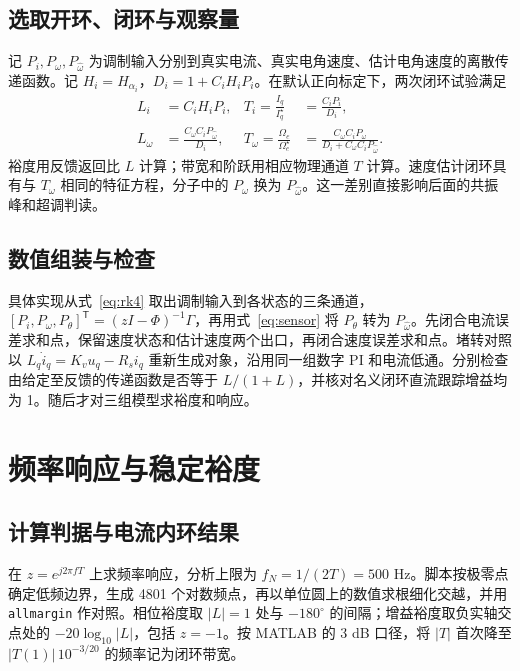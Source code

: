 \documentclass[UTF8,fontset=windows,11pt,a4paper]{ctexart}
\begin{document}
\subsection{选取开环、闭环与观察量}
记 $P_i,P_\omega,P_{\hat\omega}$ 为调制输入分别到真实电流、真实电角速度、估计电角速度的离散传递函数。记 $H_i=H_{\alpha_i}$，$D_i=1+C_iH_iP_i$。在默认正向标定下，两次闭环试验满足
\begin{align}
 L_i&=C_iH_iP_i, &
 T_i=\frac{I_q}{I_q^\star}&=\frac{C_iP_i}{D_i},\label{eq:inner}\\
 L_\omega&=\frac{C_\omega C_iP_{\hat\omega}}{D_i},&
 T_\omega=\frac{\Omega_e}{\Omega_e^\star}&=
 \frac{C_\omega C_iP_\omega}{D_i+C_\omega C_iP_{\hat\omega}} .\label{eq:outer}
\end{align}
裕度用反馈返回比 $L$ 计算；带宽和阶跃用相应物理通道 $T$ 计算。速度估计闭环具有与 $T_\omega$ 相同的特征方程，分子中的 $P_\omega$ 换为 $P_{\hat\omega}$。这一差别直接影响后面的共振峰和超调判读。

\subsection{数值组装与检查}
具体实现从式~\eqref{eq:rk4} 取出调制输入到各状态的三条通道，
$[P_i,P_\omega,P_\theta]^\mathsf{T}=(zI-\Phi)^{-1}\Gamma$，再用式~\eqref{eq:sensor} 将 $P_\theta$ 转为 $P_{\hat\omega}$。先闭合电流误差求和点，保留速度状态和估计速度两个出口，再闭合速度误差求和点。堵转对照以 $L_q\dot i_q=K_vu_q-R_si_q$ 重新生成对象，沿用同一组数字 PI 和电流低通。分别检查由给定至反馈的传递函数是否等于 $L/(1+L)$，并核对名义闭环直流跟踪增益均为 1。随后才对三组模型求裕度和响应。

\newpage
\section{频率响应与稳定裕度}
\subsection{计算判据与电流内环结果}
在 $z=e^{j2\pi fT}$ 上求频率响应，分析上限为 $f_N=1/(2T)=500$ Hz。脚本按极零点确定低频边界，生成 4801 个对数频点，再以单位圆上的数值求根细化交越，并用 \texttt{allmargin} 作对照\cite{analysis,margins}。相位裕度取 $|L|=1$ 处与 $-180^\circ$ 的间隔；增益裕度取负实轴交点处的 $-20\log_{10}|L|$，包括 $z=-1$。按 MATLAB 的 3 dB 口径，将 $|T|$ 首次降至 $|T(1)|\,10^{-3/20}$ 的频率记为闭环带宽\cite{bw}。
\end{document}
